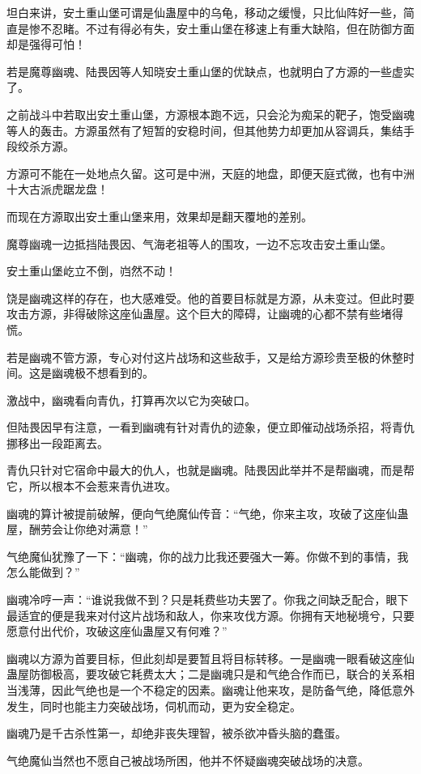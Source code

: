 \begin{this_body}
坦白来讲，安土重山堡可谓是仙蛊屋中的乌龟，移动之缓慢，只比仙阵好一些，简直是惨不忍睹。不过有得必有失，安土重山堡在移速上有重大缺陷，但在防御方面却是强得可怕！

若是魔尊幽魂、陆畏因等人知晓安土重山堡的优缺点，也就明白了方源的一些虚实了。

之前战斗中若取出安土重山堡，方源根本跑不远，只会沦为痴呆的靶子，饱受幽魂等人的轰击。方源虽然有了短暂的安稳时间，但其他势力却更加从容调兵，集结手段绞杀方源。

方源可不能在一处地点久留。这可是中洲，天庭的地盘，即便天庭式微，也有中洲十大古派虎踞龙盘！

而现在方源取出安土重山堡来用，效果却是翻天覆地的差别。

魔尊幽魂一边抵挡陆畏因、气海老祖等人的围攻，一边不忘攻击安土重山堡。

安土重山堡屹立不倒，岿然不动！

饶是幽魂这样的存在，也大感难受。他的首要目标就是方源，从未变过。但此时要攻击方源，非得破除这座仙蛊屋。这个巨大的障碍，让幽魂的心都不禁有些堵得慌。

若是幽魂不管方源，专心对付这片战场和这些敌手，又是给方源珍贵至极的休整时间。这是幽魂极不想看到的。

激战中，幽魂看向青仇，打算再次以它为突破口。

但陆畏因早有注意，一看到幽魂有针对青仇的迹象，便立即催动战场杀招，将青仇挪移出一段距离去。

青仇只针对它宿命中最大的仇人，也就是幽魂。陆畏因此举并不是帮幽魂，而是帮它，所以根本不会惹来青仇进攻。

幽魂的算计被提前破解，便向气绝魔仙传音：“气绝，你来主攻，攻破了这座仙蛊屋，酬劳会让你绝对满意！”

气绝魔仙犹豫了一下：“幽魂，你的战力比我还要强大一筹。你做不到的事情，我怎么能做到？”

幽魂冷哼一声：“谁说我做不到？只是耗费些功夫罢了。你我之间缺乏配合，眼下最适宜的便是我来对付这片战场和敌人，你来攻伐方源。你拥有天地秘境兮，只要愿意付出代价，攻破这座仙蛊屋又有何难？”

幽魂以方源为首要目标，但此刻却是要暂且将目标转移。一是幽魂一眼看破这座仙蛊屋防御极高，要攻破它耗费太大；二是幽魂只是和气绝合作而已，联合的关系相当浅薄，因此气绝也是一个不稳定的因素。幽魂让他来攻，是防备气绝，降低意外发生，同时也能主力突破战场，伺机而动，更为安全稳定。

幽魂乃是千古杀性第一，却绝非丧失理智，被杀欲冲昏头脑的蠢蛋。

气绝魔仙当然也不愿自己被战场所困，他并不怀疑幽魂突破战场的决意。


\end{this_body}
